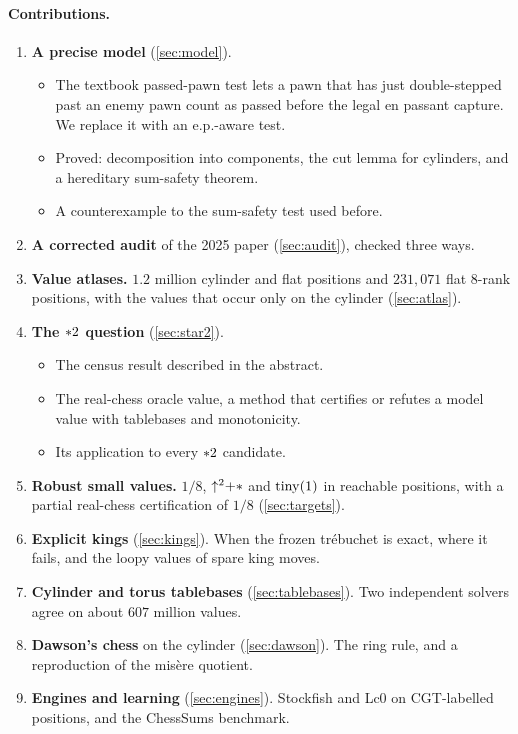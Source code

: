\paragraph{Contributions.}
\begin{enumerate}[leftmargin=*]
\item \textbf{A precise model} (\cref{sec:model}).
  \begin{itemize}
  \item The textbook passed-pawn test lets a pawn that has just double-stepped past an enemy pawn count as
    passed before the legal en passant capture. We replace it with an e.p.-aware test.
  \item Proved: decomposition into components, the cut lemma for cylinders, and a hereditary sum-safety
    theorem.
  \item A counterexample to the sum-safety test used before.
  \end{itemize}
\item \textbf{A corrected audit} of the 2025 paper (\cref{sec:audit}), checked three ways.
\item \textbf{Value atlases.} $1.2$ million cylinder and flat positions and $231{,}071$ flat $8$-rank positions,
  with the values that occur only on the cylinder (\cref{sec:atlas}).
\item \textbf{The $\mathord{\ast 2}$ question} (\cref{sec:star2}).
  \begin{itemize}
  \item The census result described in the abstract.
  \item The real-chess oracle value, a method that certifies or refutes a model value with tablebases and
    monotonicity.
  \item Its application to every $\mathord{\ast 2}$ candidate.
  \end{itemize}
\item \textbf{Robust small values.} $1/8$, $\mathord{\uparrow^{2}}{+}\mathord{\ast}$ and $\operatorname{tiny}(1)$ in reachable positions, with a
  partial real-chess certification of $1/8$ (\cref{sec:targets}).
\item \textbf{Explicit kings} (\cref{sec:kings}). When the frozen tr\'ebuchet is exact, where it fails, and the
  loopy values of spare king moves.
\item \textbf{Cylinder and torus tablebases} (\cref{sec:tablebases}). Two independent solvers agree on about
  $607$ million values.
\item \textbf{Dawson's chess} on the cylinder (\cref{sec:dawson}). The ring rule, and a reproduction of the
  misère quotient.
\item \textbf{Engines and learning} (\cref{sec:engines}). Stockfish and Lc0 on CGT-labelled positions, and the
  ChessSums benchmark.
\end{enumerate}


